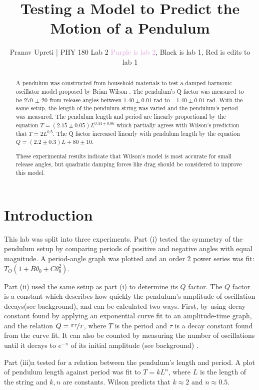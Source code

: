 \documentclass[notitlepage, twocolumn, 12pt]{article}
\title{Testing a Model to Predict the Motion of a Pendulum} %
\author{Pranav Upreti | PHY 180 Lab 2 \small{\textcolor{Plum}{Purple is lab 2}, Black is lab 1, \textcolor{WildStrawberry}{Red is edits to lab 1}}}
\begin{document}
    \maketitle
    \begin{abstract}
    A pendulum was constructed from household materials to test a damped harmonic oscillator model proposed by Brian Wilson \cite{Wilson}. The pendulum's Q factor was measured to be 270 $\pm$ 20 from release angles between $1.40 \pm 0.01$ rad to $-1.40 \pm 0.01$ rad.  With the same setup, the length of the pendulum string was varied and the pendulum's period was measured. The pendulum length and period are linearly proportional by the equation $T = (2.15 \pm 0.05)L^{0.44 \pm 0.06}$ which partially agrees with Wilson's prediction that $T = 2L^{0.5}$. The Q factor increased linearly with pendulum length by the equation $Q = (2.2 \pm 0.3)L + 80 \pm 10$. 
    
    These experimental results indicate that Wilson's model is most accurate for small release angles, but quadratic damping forces like drag should be considered to improve this model. %

    \end{abstract}
    \section*{Introduction}
    \color{Plum}
    This lab was split into three experiments. Part (i) tested the symmetry of the pendulum setup by comparing periods of positive and negative angles with equal magnitude. A period-angle graph was plotted and an order 2 power series was fit:  $T_O(1+B\theta_0+C\theta_0^2)$.
    
    Part (ii) used the same setup as part (i) to determine its $Q$ factor. The $Q$ factor is a constant which describes how quickly the pendulum's amplitude of oscillation decays(see background), and can be calculated two ways. First, by using decay constant found by applying an exponential curve fit to an amplitude-time graph, and the relation $Q=\nicefrac{\pi\tau}{T}$, where $T$ is the period and $\tau$ is a decay constant found from the curve fit. It can also be counted by measuring the number of oscillations until it decays to $e^{-\pi}$ of its initial amplitude (see background) \cite{Wilson}.
    
    Part (iii)a tested for a relation between the pendulum's length and period. A plot of pendulum length against period was fit to $T = kL^n$, where $L$ is the length of the string and $k,n$ are constants. Wilson predicts that $k \approx 2$ and $ n \approx 0.5$.
\end{document}
